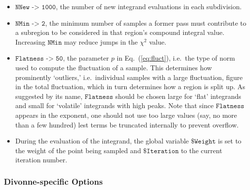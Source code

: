 \documentclass[12pt]{article}
\newcommand\ie{i.e.\ }
\newcommand\Code[1]{\ensuremath{\texttt{#1}}}
\newcommand\Option[2]{\item\Code{#1 -> #2},}
\begin{document}
\begin{itemize}
\Option{NNew}{1000}
the number of new integrand evaluations in each subdivision.

\Option{NMin}{2}
the minimum number of samples a former pass must contribute to a 
subregion to be considered in that region's compound integral value.
Increasing \Code{NMin} may reduce jumps in the $\chi^2$ value.

\Option{Flatness}{50}
the parameter $p$ in Eq.~(\ref{eq:fluct}), \ie the type of norm used to
compute the fluctuation of a sample.  This determines how prominently
`outliers,' \ie individual samples with a large fluctuation, figure in
the total fluctuation, which in turn determines how a region is split
up.  As suggested by its name, \Code{Flatness} should be chosen large
for `flat' integrands and small for `volatile' integrands with high
peaks.  Note that since \Code{Flatness} appears in the exponent, one
should not use too large values (say, no more than a few hundred) lest
terms be truncated internally to prevent overflow.

\item
During the evaluation of the integrand, the global variable
\Code{\$Weight} is set to the weight of the point being sampled and
\Code{\$Iteration} to the current iteration number.
\end{itemize}


\subsubsection{Divonne-specific Options}
\end{document}
